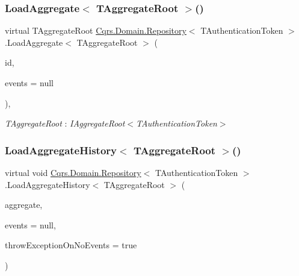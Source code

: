 \subsubsection{\texorpdfstring{Load\+Aggregate$<$ T\+Aggregate\+Root $>$()}{LoadAggregate< TAggregateRoot >()}}
{\footnotesize\ttfamily virtual T\+Aggregate\+Root \hyperlink{classCqrs_1_1Domain_1_1Repository}{Cqrs.\+Domain.\+Repository}$<$ T\+Authentication\+Token $>$.Load\+Aggregate$<$ T\+Aggregate\+Root $>$ (\begin{DoxyParamCaption}\item[{Guid}]{id,  }\item[{I\+List$<$ \hyperlink{interfaceCqrs_1_1Events_1_1IEvent}{I\+Event}$<$ T\+Authentication\+Token $>$$>$}]{events = {\ttfamily null} }\end{DoxyParamCaption})\hspace{0.3cm}{\ttfamily [protected]}, {\ttfamily [virtual]}}

\begin{Desc}
\item[Type Constraints]\begin{description}
\item[{\em T\+Aggregate\+Root} : {\em I\+Aggregate\+Root$<$T\+Authentication\+Token$>$}]\end{description}
\end{Desc}
\mbox{\label{classCqrs_1_1Domain_1_1Repository_ac634b50cbacdc3ab209f61c042cc6fab}} 
\subsubsection{\texorpdfstring{Load\+Aggregate\+History$<$ T\+Aggregate\+Root $>$()}{LoadAggregateHistory< TAggregateRoot >()}}
{\footnotesize\ttfamily virtual void \hyperlink{classCqrs_1_1Domain_1_1Repository}{Cqrs.\+Domain.\+Repository}$<$ T\+Authentication\+Token $>$.Load\+Aggregate\+History$<$ T\+Aggregate\+Root $>$ (\begin{DoxyParamCaption}\item[{T\+Aggregate\+Root}]{aggregate,  }\item[{I\+List$<$ \hyperlink{interfaceCqrs_1_1Events_1_1IEvent}{I\+Event}$<$ T\+Authentication\+Token $>$$>$}]{events = {\ttfamily null},  }\item[{bool}]{throw\+Exception\+On\+No\+Events = {\ttfamily true} }\end{DoxyParamCaption})\hspace{0.3cm}{\ttfamily [virtual]}}

